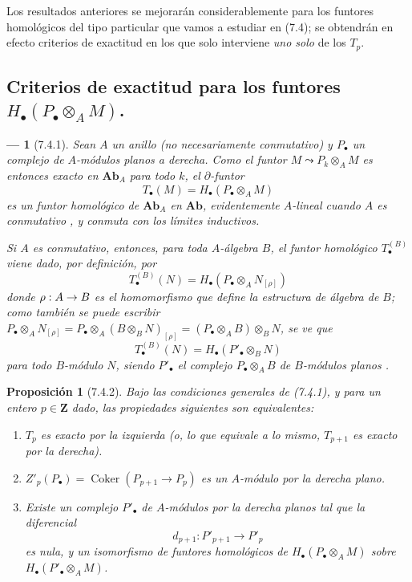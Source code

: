 \documentclass[10pt,oneside,openany]{book}
\theoremstyle{egaenv}\newtheorem*{env}{---}
\theoremstyle{egastatement}
\newtheorem*{proposition}{Proposición}
\theoremstyle{egadescription}
\newcommand{\oldpage}[2][]{\marginnote{\normalfont\scriptsize\textbf{#1}\,|\,#2}\ignorespaces}
\renewcommand{\to}{\mathchoice{\longrightarrow}{\rightarrow}{\rightarrow}{\rightarrow}}
\begin{document}
Los resultados anteriores se mejorarán considerablemente para los funtores
homológicos del tipo particular que vamos a estudiar en (7.4); se
obtendrán en efecto criterios de exactitud en los que solo interviene \emph{uno solo}
de los $T_p$.


\subsection{Criterios de exactitud para los funtores
$H_\bullet(P_\bullet\otimes_A M)$.}
\label{subsection:III.7.4.fr}

\begin{env}[7.4.1]
\label{III.7.4.1}
Sean $A$ un anillo (no necesariamente conmutativo) y $P_\bullet$ un complejo
de $A$-módulos \emph{planos} a derecha. Como el funtor
$M\leadsto P_k\otimes_A M$ es entonces exacto en $\boldsymbol{Ab}_A$ para todo $k$,
el $\partial$-funtor
\[
  T_\bullet(M)=H_\bullet(P_\bullet\otimes_A M)
  \tag{7.4.1.1}\label{III.7.4.1.1.fr}
\]
\oldpage[III]{186}
es un \emph{funtor homológico} de $\boldsymbol{Ab}_A$ en $\boldsymbol{Ab}$,
evidentemente $A$-lineal cuando $A$ es conmutativo
, y conmuta con los límites inductivos.

Si $A$ es conmutativo, entonces, para toda $A$-álgebra $B$, el funtor
homológico $T_\bullet^{(B)}$  viene dado, por definición, por
\[
  T_\bullet^{(B)}(N)
  =
  H_\bullet(P_\bullet\otimes_A N_{[\rho]})
  \tag{7.4.1.2}\label{III.7.4.1.2.fr}
\]
donde $\rho:A\to B$ es el homomorfismo que define la estructura de álgebra de
$B$; como también se puede escribir
$P_\bullet\otimes_A N_{[\rho]}=P_\bullet\otimes_A(B\otimes_B N)_{[\rho]}=(P_\bullet\otimes_A B)\otimes_B N$,
se ve que
\[
  T_\bullet^{(B)}(N)=H_\bullet(P'_\bullet\otimes_B N)
  \tag{7.4.1.3}\label{III.7.4.1.3.fr}
\]
para todo $B$-módulo $N$, siendo $P'_\bullet$ el complejo
$P_\bullet\otimes_A B$ de $B$-módulos \emph{planos}
.
\end{env}

\begin{proposition}[7.4.2]
Bajo las condiciones generales de \textup{(7.4.1)}, y para un entero $p\in\mathbf Z$
dado, las propiedades siguientes son equivalentes:
\begin{enumerate}
  \item[a)] $T_p$ es exacto por la izquierda \textup{(o, lo que equivale a lo mismo,} $T_{p+1}$
    es exacto por la derecha).
  \item[b)] $Z'_p(P_\bullet)=\operatorname{Coker}(P_{p+1}\longrightarrow P_p)$
    es un $A$-módulo por la derecha plano.
  \item[c)] Existe un complejo $P'_\bullet$ de $A$-módulos por la derecha planos
    tal que la diferencial
    \[
      d_{p+1}:P'_{p+1}\longrightarrow P'_p
    \]
    es nula, y un isomorfismo de funtores homológicos de
    $H_\bullet(P_\bullet\otimes_A M)$ sobre
    $H_\bullet(P'_\bullet\otimes_A M)$.
\end{enumerate}
\end{proposition}
\end{document}
